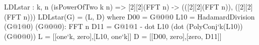 

\begin{algorithm}[!htb]
	\caption{$\ldlalgo(\matG)$}\label{alg:ldlalgo}
	\begin{algorithmic}[1]
		\Return{$(\L, \matD )$}
	\end{algorithmic}
\end{algorithm}

\begin{code}
  LDLstar : {k, n} (isPowerOfTwo k n) =>
    [2][2](FFT n) -> (([2][2](FFT n)), ([2][2](FFT n)))
  LDLstar(G) = (L, D) where
    D00 = G@0@0
    L10 = HadamardDivision (G@1@0) (G@0@0): FFT n
    D11 = G@1@1 - dot L10 (dot (PolyConj`{k}(L10)) (G@0@0))
    L = [[one`{k}, zero],[L10, one`{k}]]
    D = [[D00, zero],[zero, D11]]
\end{code}

